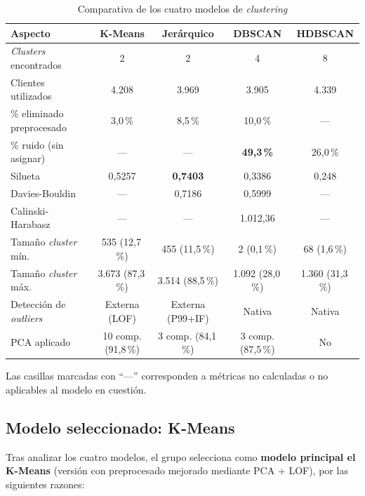\documentclass[11pt,a4paper]{article}
\begin{document}
\begin{table}[h]
\centering
\caption{Comparativa de los cuatro modelos de \textit{clustering}}
\label{tab:comparativa_final}
\small
\setlength{\tabcolsep}{4pt}
\begin{tabular}{lcccc}
\toprule
\textbf{Aspecto} & \textbf{K-Means} & \textbf{Jerárquico} & \textbf{DBSCAN} & \textbf{HDBSCAN} \\
\midrule
\textit{Clusters} encontrados & 2 & 2 & 4 & 8 \\
Clientes utilizados & 4.208 & 3.969 & 3.905 & 4.339 \\
\% eliminado preprocesado & 3,0\,\% & 8,5\,\% & 10,0\,\% & --- \\
\% ruido (sin asignar) & --- & --- & \textbf{49,3\,\%} & 26,0\,\% \\
Silueta & 0,5257 & \textbf{0,7403} & 0,3386 & 0,248 \\
Davies-Bouldin & --- & 0,7186 & 0,5999 & --- \\
Calinski-Harabasz & --- & --- & 1.012,36 & --- \\
Tamaño \textit{cluster} mín. & 535 (12,7\,\%) & 455 (11,5\,\%) & 2 (0,1\,\%) & 68 (1,6\,\%) \\
Tamaño \textit{cluster} máx. & 3.673 (87,3\,\%) & 3.514 (88,5\,\%) & 1.092 (28,0\,\%) & 1.360 (31,3\,\%) \\
Detección de \textit{outliers} & Externa (LOF) & Externa (P99+IF) & Nativa & Nativa \\
PCA aplicado & 10 comp. (91,8\,\%) & 3 comp. (84,1\,\%) & 3 comp. (87,5\,\%) & No \\
\bottomrule
\end{tabular}
\end{table}

\noindent Las casillas marcadas con ``---'' corresponden a métricas no calculadas o no aplicables al modelo en cuestión.

\subsection{Modelo seleccionado: K-Means}

Tras analizar los cuatro modelos, el grupo selecciona como \textbf{modelo principal el K-Means} (versión con preprocesado mejorado mediante PCA + LOF), por las siguientes razones:
\end{document}

